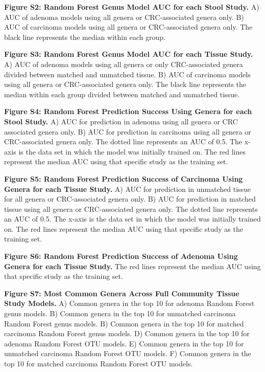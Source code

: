 \documentclass[12pt,]{article}
\begin{document}
\textbf{Figure S2: Random Forest Genus Model AUC for each Stool Study.}
A) AUC of adenoma models using all genera or CRC-associated genera only.
B) AUC of carcinoma models using all genera or CRC-associated genera
only. The black line represents the median within each group.

\textbf{Figure S3: Random Forest Genus Model AUC for each Tissue Study.}
A) AUC of adenoma models using all genera or only CRC-associated genera
divided between matched and unmatched tissue. B) AUC of carcinoma models
using all genera or CRC-associated genera only. The black line
represents the median within each group divided between matched and
unmatched tissue.

\textbf{Figure S4: Random Forest Prediction Success Using Genera for
each Stool Study.} A) AUC for prediction in adenoma using all genera or
CRC associated genera only. B) AUC for prediction in carcinoma using all
genera or CRC-associated genera only. The dotted line represents an AUC
of 0.5. The x-axis is the data set in which the model was initially
trained on. The red lines represent the median AUC using that specific
study as the training set.

\textbf{Figure S5: Random Forest Prediction Success of Carcinoma Using
Genera for each Tissue Study.} A) AUC for prediction in unmatched tissue
for all genera or CRC-associated genera only. B) AUC for prediction in
matched tissue using all genera or CRC-associated genera only. The
dotted line represents an AUC of 0.5. The x-axis is the data set in
which the model was initially trained on. The red lines represent the
median AUC using that specific study as the training set.

\textbf{Figure S6: Random Forest Prediction Success of Adenoma Using
Genera for each Tissue Study.} The red lines represent the median AUC
using that specific study as the training set.

\textbf{Figure S7: Most Common Genera Across Full Community Tissue Study
Models.} A) Common genera in the top 10 for adenoma Random Forest genus
models. B) Common genera in the top 10 for unmatched carcinoma Random
Forest genus models. B) Common genera in the top 10 for matched
carcinoma Random Forest genus models. D) Common genera in the top 10 for
adenoma Random Forest OTU models. E) Common genera in the top 10 for
unmatched carcinoma Random Forest OTU models. F) Common genera in the
top 10 for matched carcinoma Random Forest OTU models.

\newpage
\end{document}
